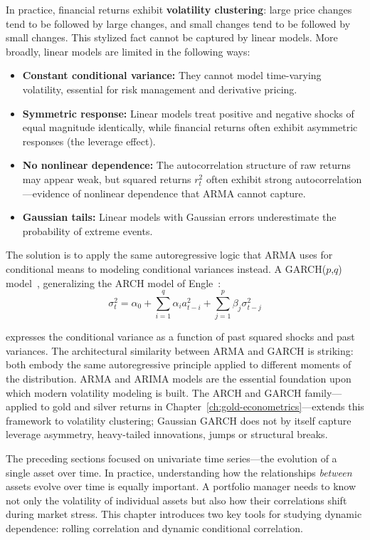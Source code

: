 In practice, financial returns exhibit \textbf{volatility clustering}: large price changes tend to be followed by large changes, and small changes tend to be followed by small changes. This stylized fact cannot be captured by linear models. More broadly, linear models are limited in the following ways:

\begin{itemize}
    \item \textbf{Constant conditional variance:} They cannot model time-varying volatility, essential for risk management and derivative pricing.
    \item \textbf{Symmetric response:} Linear models treat positive and negative shocks of equal magnitude identically, while financial returns often exhibit asymmetric responses (the leverage effect).
    \item \textbf{No nonlinear dependence:} The autocorrelation structure of raw returns may appear weak, but squared returns $r_t^2$ often exhibit strong autocorrelation---evidence of nonlinear dependence that ARMA cannot capture.
    \item \textbf{Gaussian tails:} Linear models with Gaussian errors underestimate the probability of extreme events.
\end{itemize}

The solution is to apply the same autoregressive logic that ARMA uses for conditional means to modeling conditional variances instead. A GARCH($p$,$q$) model~\cite{Bollerslev1986}, generalizing the ARCH model of Engle~\cite{Engle1982}:
$$\sigma_t^2 = \alpha_0 + \sum_{i=1}^{q} \alpha_i a_{t-i}^2 + \sum_{j=1}^{p} \beta_j \sigma_{t-j}^2$$

expresses the conditional variance as a function of past squared shocks and past variances. The architectural similarity between ARMA and GARCH is striking: both embody the same autoregressive principle applied to different moments of the distribution. ARMA and ARIMA models are the essential foundation upon which modern volatility modeling is built. The ARCH and GARCH family---applied to gold and silver returns in Chapter~\ref{ch:gold-econometrics}---extends this framework to volatility clustering; Gaussian GARCH does not by itself capture leverage asymmetry, heavy-tailed innovations, jumps or structural breaks.


The preceding sections focused on univariate time series---the evolution of a single asset over time. In practice, understanding how the relationships \emph{between} assets evolve over time is equally important. A portfolio manager needs to know not only the volatility of individual assets but also how their correlations shift during market stress. This chapter introduces two key tools for studying dynamic dependence: rolling correlation and dynamic conditional correlation.
